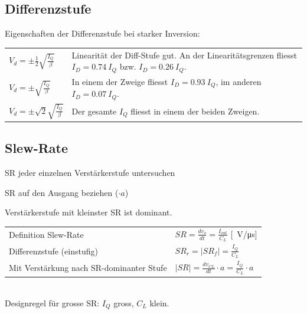 \subsection{Differenzstufe}
Eigenschaften der Differenzstufe bei starker Inversion:\\
\begin{tabular}{ll}
	$V_d = \pm \frac{1}{2}\sqrt{\frac{I_Q}{\beta}}$& Linearität der Diff-Stufe gut. An der Linearitätsgrenzen fliesst $I_D = \SI{0.74}{I_Q}$ bzw. $I_D = \SI{0.26}{I_Q}$.\\
	$V_d = \pm\sqrt{\frac{I_Q}{\beta}}$& In einem der Zweige fliesst $I_D = \SI{0.93}{I_Q}$, im anderen $I_D = \SI{0.07}{I_Q}$.\\
	$V_d = \pm\sqrt{2}\sqrt{\frac{I_Q}{\beta}}$& Der gesamte $I_Q$ fliesst in einem der beiden Zweigen.
\end{tabular}

\subsection{Slew-Rate}
\begin{compactenum}
	\item SR jeder einzelnen Verstärkerstufe untersuchen
	\item SR auf den Ausgang beziehen ($\cdot a$)
	\item Verstärkerstufe mit kleinster SR ist dominant.
\end{compactenum}
	\begin{tabular}{ll}
		Definition Slew-Rate&$SR=\frac{dv_o}{dt}=\frac{I_{out}}{C_L}$ [\SI{}{\volt/\micro\second}]\\
		Differenzstufe (einstufig)& $SR_r = |SR_f|=\frac{I_Q}{C_L}$\\
		Mit Verstärkung nach SR-dominanter Stufe&$|SR|=\frac{dv_{CL}}{dt}\cdot a= \frac{I_Q}{C_L}\cdot a$
	\end{tabular}\\[1ex]\]
	Designregel für grosse SR: $I_Q$ gross, $C_L$ klein.

